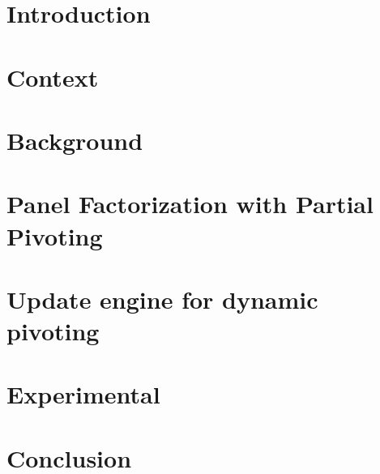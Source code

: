 \maketitle
\newpage
\null
\newpage

%  

\tableofcontents
\newpage


\chapter{Introduction}\label{intro}%


\chapter{Context}\label{context}


\chapter{Background}\label{background}


\chapter{Panel Factorization with Partial Pivoting}\label{panel}


\chapter{Update engine for dynamic pivoting}\label{update}


\chapter{Experimental}\label{experimental}


\chapter*{Conclusion}\label{conclusion}







